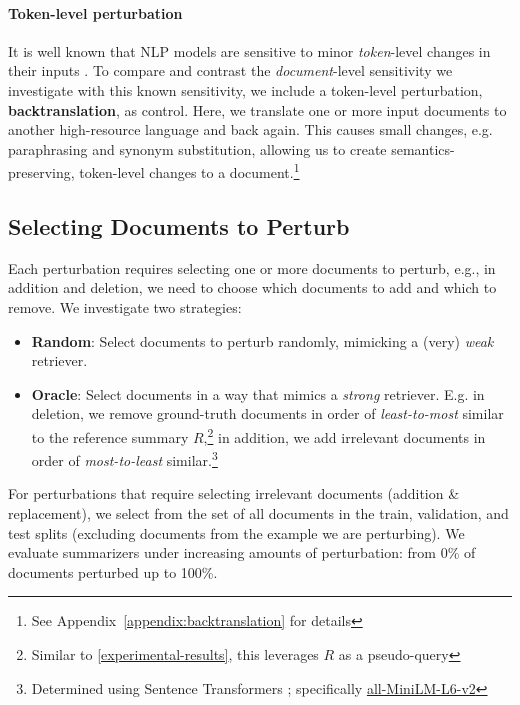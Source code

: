 \documentclass[11pt]{article}
\begin{document}
\paragraph{Token-level perturbation}

It is well known that NLP models are sensitive to minor \textit{token}-level changes in their inputs \citep{prabhakaran-etal-2019-perturbation, niu-etal-2020-evaluating, ribeiro-etal-2020-beyond, moradi-samwald-2021-evaluating}. To compare and contrast the \textit{document}-level sensitivity we investigate with this known sensitivity, we include a token-level perturbation, \textbf{backtranslation}, as control. Here, we translate one or more input documents to another high-resource language and back again. This causes small changes, e.g. paraphrasing and synonym substitution, allowing us to create semantics-preserving, token-level changes to a document.\footnote{See Appendix~\ref{appendix:backtranslation} for details}

\subsection{Selecting Documents to Perturb}
\label{experimental-setup:document-selection}

Each perturbation requires selecting one or more documents to perturb, e.g., in addition and deletion, we need to choose which documents to add and which to remove. We investigate two strategies:

\begin{itemize}[itemsep=0.2pt, topsep=3pt, leftmargin=10pt]
    \item \textbf{Random}: Select documents to perturb randomly, mimicking a (very) \textit{weak}
    retriever.
    \item{\textbf{Oracle}}: Select documents in a way that mimics a \textit{strong} retriever. E.g. in deletion, we remove ground-truth documents in order of \textit{least-to-most} similar to the reference summary \(R\),\footnote{Similar to \textsection \ref{experimental-results}, this leverages \(R\) as a pseudo-query} in addition, we add irrelevant documents in order of \textit{most-to-least} similar.\footnote{Determined using Sentence Transformers \citep{sbert}; specifically \href{https://huggingface.co/sentence-transformers/all-MiniLM-L6-v2}{all-MiniLM-L6-v2}}
\end{itemize}


\noindent For perturbations that require selecting irrelevant documents (addition \& replacement), we select from the set of all documents in the train, validation, and test splits (excluding documents from the example we are perturbing). We evaluate summarizers under increasing amounts of perturbation: from 0\% of documents perturbed up to 100\%.
\end{document}
